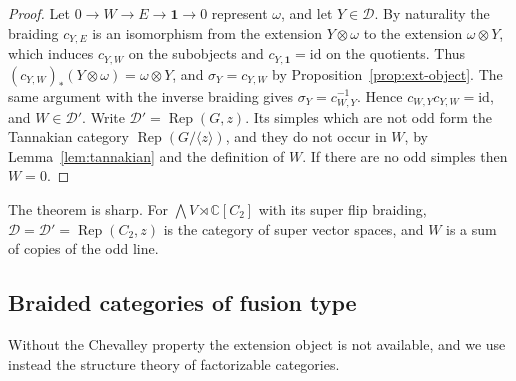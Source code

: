 \documentclass[11pt,reqno]{amsart}
\theoremstyle{definition}
\newcommand{\one}{\mathbf 1}
\newcommand{\CC}{\mathbb C}
\newcommand{\Rep}{\operatorname{Rep}}
\begin{document}
\begin{proof}
Let $0\to W\to E\to\one\to0$ represent $\omega$, and let $Y\in\mathcal D$. By naturality the braiding $c_{Y,E}$ is an isomorphism from the extension $Y\otimes\omega$ to the extension $\omega\otimes Y$, which induces $c_{Y,W}$ on the subobjects and $c_{Y,\one}=\mathrm{id}$ on the quotients. Thus $(c_{Y,W})_*(Y\otimes\omega)=\omega\otimes Y$, and $\sigma_Y=c_{Y,W}$ by Proposition~\ref{prop:ext-object}. The same argument with the inverse braiding gives $\sigma_Y=c_{W,Y}^{-1}$. Hence $c_{W,Y}c_{Y,W}=\mathrm{id}$, and $W\in\mathcal D'$. Write $\mathcal D'=\Rep(G,z)$. Its simples which are not odd form the Tannakian category $\Rep(G/\langle z\rangle)$, and they do not occur in $W$, by Lemma~\ref{lem:tannakian} and the definition of $W$. If there are no odd simples then $W=0$.
\end{proof}

The theorem is sharp. For $\bigwedge V\rtimes\CC[C_2]$ with its super flip braiding, $\mathcal D=\mathcal D'=\Rep(C_2,z)$ is the category of super vector spaces, and $W$ is a sum of copies of the odd line.

\subsection{Braided categories of fusion type}
Without the Chevalley property the extension object is not available, and we use instead the structure theory of factorizable categories.
\end{document}
